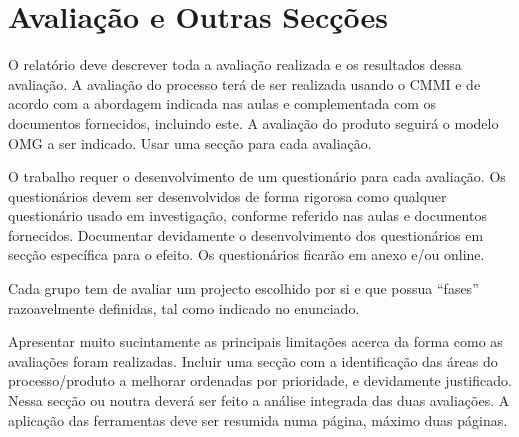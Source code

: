 \documentclass[openany,10pt,a4paper]{article}
\begin{document}
\section{Avaliação e Outras Secções}
O relatório deve descrever toda a avaliação realizada e os resultados dessa avaliação. A avaliação do processo terá de ser realizada usando o CMMI e de acordo com a abordagem indicada nas aulas e complementada com os documentos fornecidos, incluindo este. A avaliação do produto seguirá o modelo OMG a ser indicado. Usar uma secção para cada avaliação.

O trabalho requer o desenvolvimento de um questionário para cada avaliação. Os questionários devem ser desenvolvidos de forma rigorosa como qualquer questionário usado em investigação, conforme referido nas aulas e documentos fornecidos. Documentar devidamente o desenvolvimento dos questionários em secção específica para o efeito. Os questionários ficarão em anexo e/ou online.

Cada grupo tem de avaliar um projecto escolhido por si e que possua “fases” razoavelmente definidas, tal como indicado no enunciado.

Apresentar muito sucintamente as principais limitações acerca da forma como as avaliações foram realizadas. Incluir uma secção com a identificação das áreas do processo/produto a melhorar ordenadas por prioridade, e devidamente justificado. Nessa secção ou noutra deverá ser feito a análise integrada das duas avaliações. A aplicação das ferramentas deve ser resumida numa página, máximo duas páginas.
\end{document}
